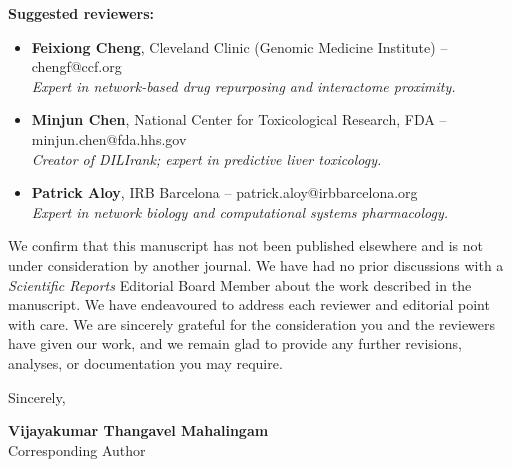 \documentclass[11pt]{article}
\begin{document}
\bigskip
\noindent \textbf{Suggested reviewers:}
\begin{itemize}
    \item \textbf{Feixiong Cheng}, Cleveland Clinic (Genomic Medicine Institute) -- chengf@ccf.org \\ \textit{Expert in network-based drug repurposing and interactome proximity.}
    \item \textbf{Minjun Chen}, National Center for Toxicological Research, FDA -- minjun.chen@fda.hhs.gov \\ \textit{Creator of DILIrank; expert in predictive liver toxicology.}
    \item \textbf{Patrick Aloy}, IRB Barcelona -- patrick.aloy@irbbarcelona.org \\ \textit{Expert in network biology and computational systems pharmacology.}
\end{itemize}

\bigskip
\noindent
We confirm that this manuscript has not been published elsewhere and is not under consideration by another journal. We have had no prior discussions with a \textit{Scientific Reports} Editorial Board Member about the work described in the manuscript. We have endeavoured to address each reviewer and editorial point with care. We are sincerely grateful for the consideration you and the reviewers have given our work, and we remain glad to provide any further revisions, analyses, or documentation you may require.

\bigskip
\noindent
Sincerely,

\vspace{1em}

\noindent
\textbf{Vijayakumar Thangavel Mahalingam} \\
Corresponding Author
\end{document}

